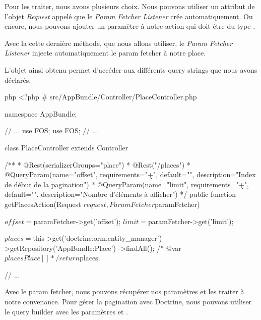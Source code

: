 \documentclass[big]{zmdocument}
\begin{document}
Pour les traiter, nous avons plusieurs choix. Nous pouvons utiliser un attribut de l'objet \textit{Request} appelé  que le \textit{Param Fetcher Listener} crée automatiquement. Ou encore, nous pouvons ajouter un paramètre à notre action qui doit être du type  .



Avec la cette dernière méthode, que nous allons utiliser, le \textit{Param Fetcher Listener} injecte automatiquement le param fetcher à notre place.



L'objet ainsi obtenu permet d'accéder aux différents query strings que nous avons déclarés.



\begin{CodeBlock}{php}
<?php
# src/AppBundle/Controller/PlaceController.php

namespace AppBundle\Controller;

// ...
use FOS\RestBundle\Controller\Annotations\QueryParam;
use FOS\RestBundle\Request\ParamFetcher;
// ...

class PlaceController extends Controller
{

    /**
     * @Rest\View(serializerGroups={"place"})
     * @Rest\Get("/places")
     * @QueryParam(name="offset", requirements="\d+", default="", description="Index de début de la pagination")
     * @QueryParam(name="limit", requirements="\d+", default="", description="Nombre d'éléments à afficher")
     */
    public function getPlacesAction(Request $request, ParamFetcher $paramFetcher)
    {
        $offset = $paramFetcher->get('offset');
        $limit = $paramFetcher->get('limit');

        $places = $this->get('doctrine.orm.entity_manager')
                ->getRepository('AppBundle:Place')
                ->findAll();
        /* @var $places Place[] */

        return $places;
    }
// ...
}
\end{CodeBlock}



Avec le param fetcher, nous pouvons récupérer nos paramètres et les traiter à notre convenance. 
Pour gérer la pagination avec Doctrine, nous pouvons utiliser le query builder avec les paramètres  et .
\end{document}
